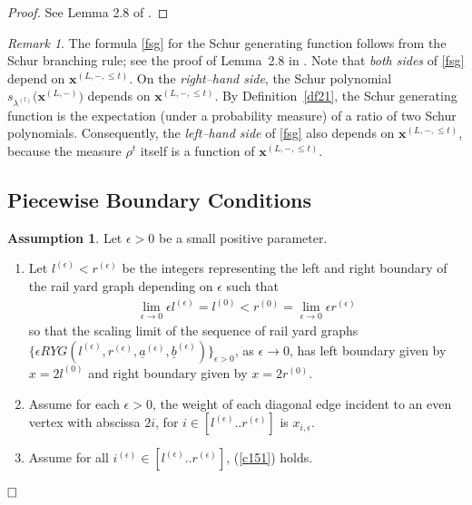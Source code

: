 \documentclass[11pt]{amsart}
\theoremstyle{plain}
\theoremstyle{definition}
\newtheorem{assumption}[theorem]{Assumption}
\theoremstyle{remark}
\newtheorem{remark}[theorem]{Remark}
\numberwithin{equation}{section}
\numberwithin{theorem}{section}
\numberwithin{figure}{section}
\begin{document}
\begin{proof}See Lemma 2.8 of \cite{Li21}.
\end{proof}

\begin{remark}The formula \eqref{fsg} for the Schur generating function follows from the Schur
branching rule; see the proof of Lemma~2.8 in \cite{Li21}. Note that \emph{both
sides} of \eqref{fsg} depend on \(\mathbf{x}^{(L,-,\le t)}\). On the
\emph{right–hand side}, the Schur polynomial
\(s_{\lambda^{(l)}}\!\big(\mathbf{x}^{(L,-)}\big)\) depends on
\(\mathbf{x}^{(L,-,\le t)}\). By Definition~\ref{df21}, the Schur generating
function is the expectation (under a probability measure) of a ratio of two
Schur polynomials. Consequently, the \emph{left–hand side} of \eqref{fsg} also
depends on \(\mathbf{x}^{(L,-,\le t)}\), because the measure \(\rho^t\) itself
is a function of \(\mathbf{x}^{(L,-,\le t)}\).
\end{remark}


\subsection{Piecewise Boundary Conditions}\label{pwbd}



\begin{assumption}\label{ap41}Let $\epsilon>0$ be a small positive parameter. 
\begin{enumerate}
\item Let $l^{(\epsilon)}<r^{(\epsilon)}$ be the  integers representing the left and right boundary of the rail yard graph depending on $\epsilon$ such that
\begin{eqnarray*}
\lim_{\epsilon\rightarrow 0}\epsilon l^{(\epsilon)}=l^{(0)}<r^{(0)}=\lim_{\epsilon\rightarrow 0}\epsilon r^{(\epsilon)}
\end{eqnarray*}
so that the scaling limit of the sequence of rail yard graphs $\{\epsilon RYG(l^{(\epsilon)},r^{(\epsilon)},\underline{a}^{(\epsilon)},\underline{b}^{(\epsilon)})\}_{\epsilon>0}$, as $\epsilon\rightarrow 0$, has left boundary given by $x=2l^{(0)}$ and right boundary given by $x=2r^{(0)}$.
\item Assume for each $\epsilon>0$, the weight of each diagonal edge incident to an even vertex with abscissa $2i$, for $i\in[l^{(\epsilon)}..r^{(\epsilon)}]$ is $x_{i,\epsilon}$.
\item Assume for all $i^{(\epsilon)}\in[l^{(\epsilon)}..r^{(\epsilon)}]$, (\ref{c151}) holds.
\end{enumerate}$\hfill\Box$
\end{assumption}
\end{document}
